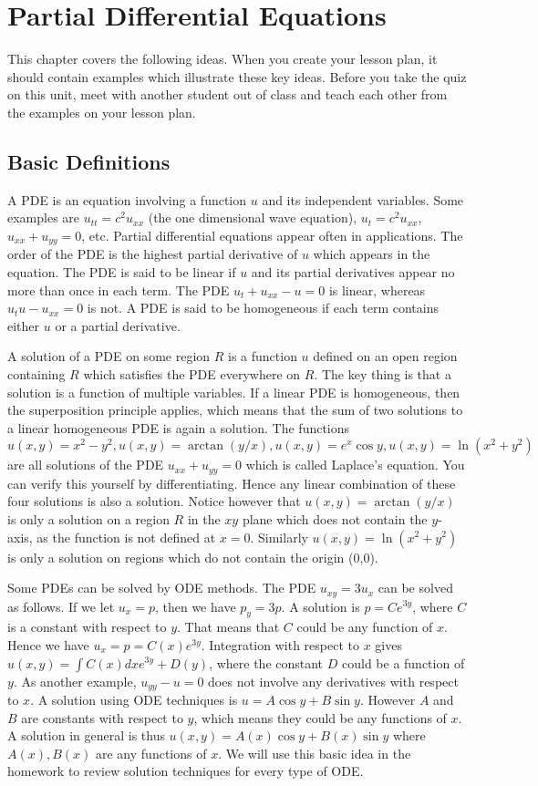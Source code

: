 
\chapter{Partial Differential Equations}

This chapter covers the following ideas. When you create your lesson plan, it should contain examples which illustrate these key ideas. Before you take the quiz on this unit, meet with another student out of class and teach each other from the examples on your lesson plan. 




\section{Basic Definitions}
A PDE is an equation involving a function $u$ and its independent variables. Some examples are $u_{tt}=c^2u_{xx}$ (the one dimensional wave equation), $u_t = c^2u_{xx}$, $u_{xx}+u_{yy}=0$, etc. Partial differential equations appear often in applications.  The order of the PDE is the highest partial derivative of $u$ which appears in the equation.  The PDE is said to be linear if $u$ and its partial derivatives appear no more than once in each term.  The PDE $u_t+u_{xx}-u=0$ is linear, whereas $u_t u-u_{xx}=0$ is not.  A PDE is said to be homogeneous if each term contains either $u$ or a partial derivative.

A solution of a PDE on some region $R$ is a function $u$ defined on an open region containing $R$ which satisfies the PDE everywhere on $R$.  The key thing is that a solution is a function of multiple variables. If a linear PDE is homogeneous, then the superposition principle applies, which means that the sum of two solutions to a linear homogeneous PDE is again a solution.  The functions $u(x,y) = x^2-y^2,u(x,y)= \arctan(y/x),u(x,y)=e^x\cos y, u(x,y)=\ln(x^2+y^2)$ are all solutions of the PDE $u_{xx}+u_{yy}=0$ which is called Laplace's equation.  You can verify this yourself by differentiating. Hence any linear combination of these four solutions is also a solution. Notice however that $u(x,y)= \arctan(y/x)$ is only a solution on a region $R$ in the $xy$ plane which does not contain the $y$-axis, as the function is not defined at $x=0$.  Similarly $u(x,y)=\ln(x^2+y^2)$ is only a solution on regions which do not contain the origin (0,0).

Some PDEs can be solved by ODE methods.  The PDE $u_{xy}=3u_x$ can be solved as follows.  If we let $u_x = p$, then we have $p_y=3p$. A solution is $p=Ce^{3y}$, where $C$ is a constant with respect to $y$.  That means that $C$ could be any function of $x$.  Hence we have $u_x = p = C(x)e^{3y}$.  Integration with respect to $x$ gives $u(x,y) = \int C(x)dx e^{3y}+D(y)$, where the constant $D$ could be a function of $y$.  As another example, $u_{yy}-u=0$ does not involve any derivatives with respect to $x$.  A solution using ODE techniques is $u = A\cos y +B\sin y$.  However $A$ and $B$  are constants with respect to $y$, which means they could be any functions of $x$.  A solution in general is thus $u(x,y) = A(x)\cos y +B(x)\sin y$ where $A(x),B(x)$ are any functions of $x$.  We will use this basic idea in the homework to review solution techniques for every type of ODE.

